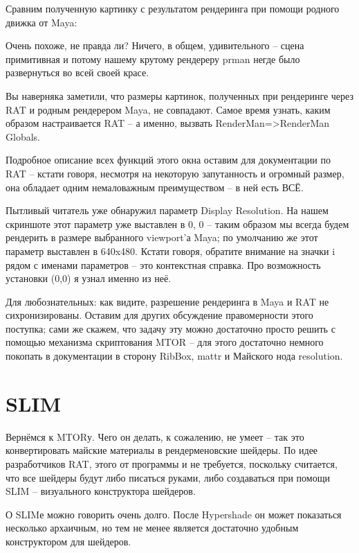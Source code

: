  Сравним полученную картинку с результатом
    рендеринга при помощи родного движка от Maya:


 Очень похоже, не правда ли? Ничего, в общем,
    удивительного – сцена примитивная и потому нашему крутому рендереру
    prman негде было развернуться во всей своей красе.

 Вы наверняка заметили, что размеры картинок,
    полученных при рендеринге через RAT и родным рендерером Maya, не
    совпадают. Самое время узнать, каким образом настраивается RAT – а
    именно, вызвать RenderMan=>RenderMan Globals.


 Подробное описание всех функций этого окна оставим
    для документации по RAT – кстати говоря, несмотря на некоторую
    запутанность и огромный размер, она обладает одним немаловажным
    преимуществом – в ней есть ВСЁ.

 Пытливый читатель уже обнаружил параметр Display
    Resolution. На нашем скриншоте этот параметр уже выставлен в 0, 0 –
    таким образом мы всегда будем рендерить в размере выбранного
    viewport’а Maya; по умолчанию же этот параметр выставлен в 640x480.
    Кстати говоря, обратите внимание на значки i рядом с именами параметров –
    это контекстная справка. Про возможность установки (0,0) я узнал
    именно из неё.

 Для
    любознательных: как видите, разрешение
    рендеринга в Maya и RAT не сихронизированы. Оставим для других
    обсуждение правомерности этого поступка; сами же скажем, что задачу
    эту можно достаточно просто решить с помощью механизма скриптования
    MTOR – для этого достаточно немного покопать в документации в
    сторону RibBox, mattr и Майского нода resolution.
  
\section*{SLIM}

 Вернёмся к MTORу. Чего он делать, к сожалению, не
    умеет – так это конвертировать майские материалы в рендерменовские
    шейдеры. По идее разработчиков RAT, этого от программы и не
    требуется, поскольку считается, что все шейдеры будут либо писаться
    руками, либо создаваться при помощи SLIM – визуального конструктора
    шейдеров.

 О SLIMе можно говорить очень долго. После
    Hypershade он может показаться несколько архаичным, но тем не менее
    является достаточно удобным конструктором для шейдеров.

